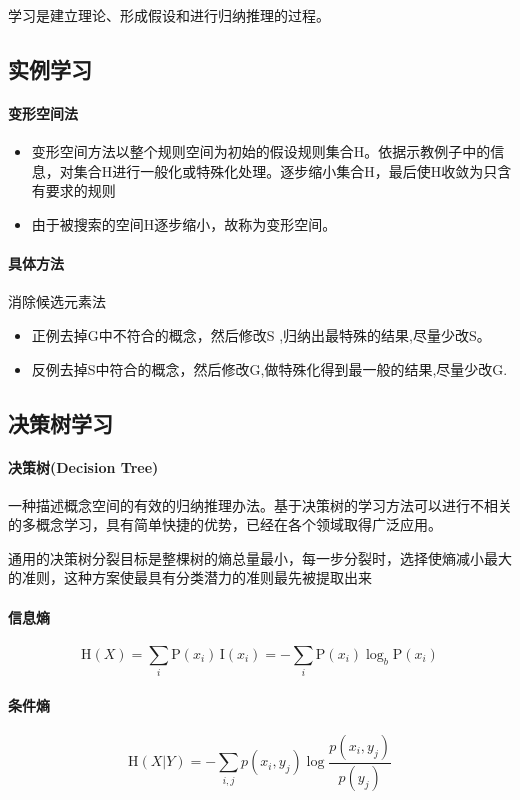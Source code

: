 \documentclass[UTF8,a4paper]{ctexart}
\begin{document}
学习是建立理论、形成假设和进行归纳推理的过程。

\subsection{实例学习}
\paragraph{变形空间法}
\begin{itemize}
	\item 变形空间方法以整个规则空间为初始的假设规则集合H。依据示教例子中的信息，对集合H进行一般化或特殊化处理。逐步缩小集合H，最后使H收敛为只含有要求的规则
	\item 由于被搜索的空间H逐步缩小，故称为变形空间。
\end{itemize}

\paragraph{具体方法}消除候选元素法
\begin{itemize}
	\item 正例去掉G中不符合的概念，然后修改S ,归纳出最特殊的结果,尽量少改S。
	\item    反例去掉S中符合的概念，然后修改G,做特殊化得到最一般的结果,尽量少改G.
\end{itemize}

\subsection{决策树学习}
\paragraph{决策树(Decision Tree)}
一种描述概念空间的有效的归纳推理办法。基于决策树的学习方法可以进行不相关的多概念学习，具有简单快捷的优势，已经在各个领域取得广泛应用。

通用的决策树分裂目标是整棵树的熵总量最小，每一步分裂时，选择使熵减小最大的准则，这种方案使最具有分类潜力的准则最先被提取出来

\paragraph{信息熵}
\[\mathrm{H} (X)=\sum _{{i}}{{\mathrm  {P}}(x_{i})\,{\mathrm  {I}}(x_{i})}=-\sum _{{i}}{{\mathrm  {P}}(x_{i})\log _{b}{\mathrm  {P}}(x_{i})}\]

\paragraph{条件熵}
\[{\displaystyle \mathrm {H} (X|Y)=-\sum _{i,j}p(x_{i},y_{j})\log {\frac {p(x_{i},y_{j})}{p(y_{j})}}}\]
\end{document}
